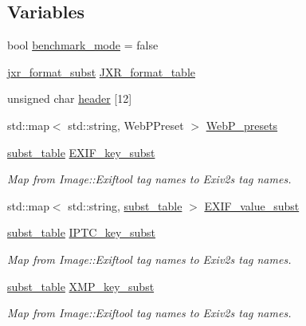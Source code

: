 \subsection*{Variables}
\begin{DoxyCompactItemize}
\item 
bool \hyperlink{namespace_photo_finish_a9fdd5a183ce1374d876e4f23f1b0fbf3}{benchmark\+\_\+mode} = false
\item 
\hyperlink{namespace_photo_finish_a230739f3d4e738115f80e9a77e225959}{jxr\+\_\+format\+\_\+subst} \hyperlink{namespace_photo_finish_ac16fd09be8f697a59652e494e458a2f7}{J\+X\+R\+\_\+format\+\_\+table}
\item 
unsigned char \hyperlink{namespace_photo_finish_ac96a97b2dc0860744b9f767795c3a418}{header} \mbox{[}12\mbox{]}
\item 
std\+::map$<$ std\+::string, Web\+P\+Preset $>$ \hyperlink{namespace_photo_finish_a025b86e55467a4d75619d6a9098c4704}{Web\+P\+\_\+presets}
\item 
\hyperlink{namespace_photo_finish_a99d3cfc086c8264e778255f5ef2b8b19}{subst\+\_\+table} \hyperlink{namespace_photo_finish_acca01aac5edaf04fa23bc5a9d77d8dfb}{E\+X\+I\+F\+\_\+key\+\_\+subst}
\begin{DoxyCompactList}\small\item\em Map from Image\+::\+Exiftool tag names to Exiv2\textquotesingle{}s tag names. \end{DoxyCompactList}\item 
std\+::map$<$ std\+::string, \hyperlink{namespace_photo_finish_a99d3cfc086c8264e778255f5ef2b8b19}{subst\+\_\+table} $>$ \hyperlink{namespace_photo_finish_a1f0c5f70be05938487cfe6ece463e22a}{E\+X\+I\+F\+\_\+value\+\_\+subst}
\item 
\hyperlink{namespace_photo_finish_a99d3cfc086c8264e778255f5ef2b8b19}{subst\+\_\+table} \hyperlink{namespace_photo_finish_a7197686a73deb3020e44cbb3f626bfc7}{I\+P\+T\+C\+\_\+key\+\_\+subst}
\begin{DoxyCompactList}\small\item\em Map from Image\+::\+Exiftool tag names to Exiv2\textquotesingle{}s tag names. \end{DoxyCompactList}\item 
\hyperlink{namespace_photo_finish_a99d3cfc086c8264e778255f5ef2b8b19}{subst\+\_\+table} \hyperlink{namespace_photo_finish_a991ab8204a327f645f121d78ca873348}{X\+M\+P\+\_\+key\+\_\+subst}
\begin{DoxyCompactList}\small\item\em Map from Image\+::\+Exiftool tag names to Exiv2\textquotesingle{}s tag names. \end{DoxyCompactList}\end{DoxyCompactItemize}


